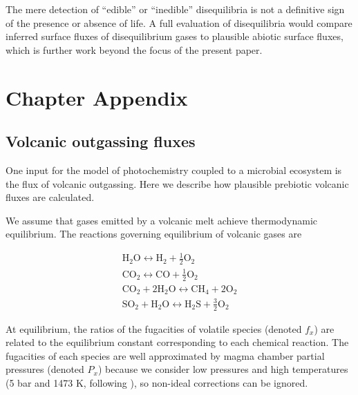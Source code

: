The mere detection of ``edible'' or ``inedible'' disequilibria is not a definitive sign of the presence or absence of life.  A full evaluation of disequilibria would compare inferred surface fluxes of disequilibrium gases to plausible abiotic surface fluxes, which is further work beyond the focus of the present paper.

\section{Chapter Appendix}

\subsection{Volcanic outgassing fluxes} \label{sec:diseq_a}

One input for the model of photochemistry coupled to a microbial ecosystem is the flux of volcanic outgassing. Here we describe how plausible prebiotic volcanic fluxes are calculated. 

We assume that gases emitted by a volcanic melt achieve thermodynamic equilibrium. The reactions governing equilibrium of volcanic gases are

\begin{gather}
  \mathrm{H_2O} \leftrightarrow \mathrm{H_2} + \frac{1}{2} \mathrm{O_2} \\
  \mathrm{CO_2} \leftrightarrow \mathrm{CO} + \frac{1}{2} \mathrm{O_2} \\
  \mathrm{CO_2} + 2 \mathrm{H_2O} \leftrightarrow \mathrm{CH_4} + 2 \mathrm{O_2} \\
  \mathrm{SO_2} + \mathrm{H_2O} \leftrightarrow \mathrm{H_2S} + \frac{3}{2} \mathrm{O_2}
\end{gather}

At equilibrium, the ratios of the fugacities of volatile species (denoted $f_x$) are related to the equilibrium constant corresponding to each chemical reaction. The fugacities of each species are well approximated by magma chamber partial pressures (denoted $P_x$) because we consider low pressures and high temperatures (5 bar and 1473 K, following \citet{Holland_1984}), so non-ideal corrections can be ignored. 

